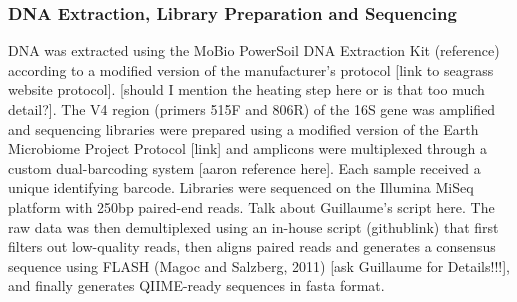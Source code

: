 \subsubsection{DNA Extraction, Library Preparation and Sequencing}

DNA was extracted using the MoBio PowerSoil DNA Extraction Kit (reference) according to a modified version of the manufacturer's protocol [link to seagrass website protocol]. [should I mention the heating step here or is that too much detail?]. The V4 region (primers 515F and 806R) of the 16S gene was amplified and sequencing libraries were prepared using a modified version of the Earth Microbiome Project Protocol [link] and amplicons were multiplexed through a custom dual-barcoding system [aaron reference here]. Each sample received a unique identifying barcode. Libraries were sequenced on the Illumina MiSeq platform with 250bp paired-end reads. Talk about Guillaume's script here. The raw data was then demultiplexed using an in-house script (githublink) that first filters out low-quality reads, then aligns paired reads and generates a consensus sequence using FLASH (Magoc and Salzberg, 2011) [ask Guillaume for Details!!!], and finally generates QIIME-ready sequences in fasta format. 

    